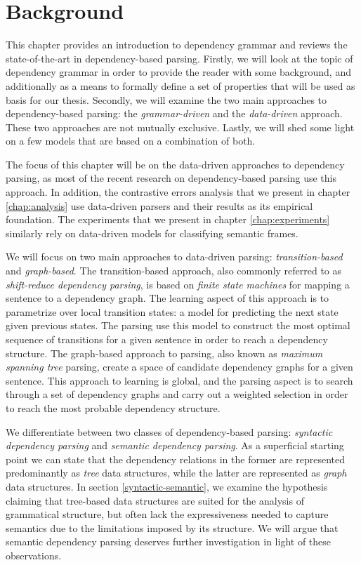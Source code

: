 \chapter{Background}
\label{chap:background}

This chapter provides an introduction to dependency grammar and reviews the state-of-the-art in dependency-based parsing. Firstly, we will look at the topic of dependency grammar in order to provide the reader with some background, and additionally as a means to formally define a set of properties that will be used as basis for our thesis. Secondly, we will examine the two main approaches to dependency-based parsing: the \textit{grammar-driven} and the \textit{data-driven} approach. These two approaches are not mutually exclusive. Lastly, we will shed some light on a few models that are based on a combination of both.

The focus of this chapter will be on the data-driven approaches to dependency parsing, as most of the recent research on dependency-based parsing use this approach. In addition, the contrastive errors analysis that we present in chapter \ref{chap:analysis} use data-driven parsers and their results as its empirical foundation. The experiments that we present in chapter \ref{chap:experiments} similarly rely on data-driven models for classifying semantic frames.

We will focus on two main approaches to data-driven parsing: \textit{transition-based} and \textit{graph-based}. The transition-based approach, also commonly referred to as \textit{shift-reduce dependency parsing}, is based on \textit{finite state machines} for mapping a sentence to a dependency graph. The learning aspect of this approach is to parametrize over local transition states: a model for predicting the next state given previous states. The parsing use this model to construct the most optimal sequence of transitions for a given sentence in order to reach a dependency structure. The graph-based approach to parsing, also known as \textit{maximum spanning tree} parsing, create a space of candidate dependency graphs for a given sentence. This approach to learning is global, and the parsing aspect is to search through a set of dependency graphs and carry out a weighted selection in order to reach the most probable dependency structure.


We differentiate between two classes of dependency-based parsing: \textit{syntactic dependency parsing} and \textit{semantic dependency parsing}. As a superficial starting point we can state that the dependency relations in the former are represented predominantly as \textit{tree} data structures, while the latter are represented as \textit{graph} data structures. In section \ref{syntactic-semantic}, we examine the hypothesis claiming that tree-based data structures are suited for the analysis of grammatical structure, but often lack the expressiveness needed to capture semantics due to the limitations imposed by its structure. We will argue that semantic dependency parsing deserves further investigation in light of these observations.

